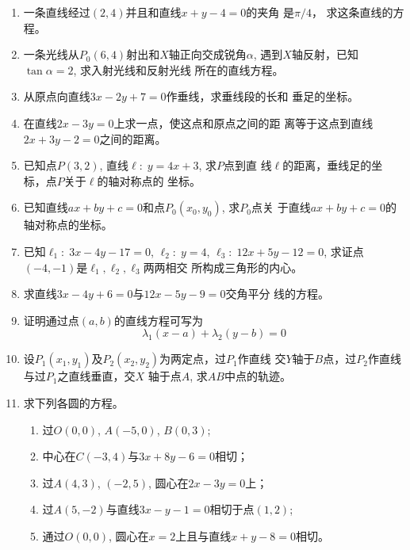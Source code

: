 \begin{enumerate}
\item 一条直线经过$(2,4)$并且和直线$x+y-4=0$的夹角
是$\pi/4$，
求这条直线的方程。
\item 一条光线从$P_0(6,4)$射出和$X$轴正向交成锐角$\alpha$, 
遇到$X$轴反射，已知$\tan\alpha=2$, 求入射光线和反射光线
所在的直线方程。
\item 从原点向直线$3x-2y+7=0$作垂线，求垂线段的长和
垂足的坐标。
\item 在直线$2x-3y=0$上求一点，使这点和原点之间的距
离等于这点到直线$2x+3y-2=0$之间的距离。
\item 已知点$P(3,2)$, 直线$\ell:\; y=4x+3$, 求$P$点到直
线$\ell$的距离，垂线足的坐标，点$P$关于$\ell$的轴对称点的
坐标。
\item 已知直线$ax+by+c=0$和点$P_0(x_0,y_0)$, 求$P_0$点关
于直线$ax+by+c=0$的轴对称点的坐标。
\item 已知$\ell_1:\; 3x-4y-17=0$, $\ell_2:\; y=4$, $\ell_3:\; 12x+5y-12=0$, 求证点$(-4,-1)$是$\ell_1,\ell_2,\ell_3$两两相交
所构成三角形的内心。
\item 求直线$3x-4y+6=0$与$12x-5y-9=0$交角平分
线的方程。
\item 证明通过点$(a,b)$的直线方程可写为
\[\lambda_1(x-a)+\lambda_2(y-b)=0\]
\item 设$P_1(x_1,y_1)$及$P_2(x_2,y_2)$为两定点，过$P_1$作直线
交$Y$轴于$B$点，过$P_2$作直线与过$P_1$之直线垂直，交$X$
轴于点$A$, 求$AB$中点的轨迹。
\item 求下列各圆的方程。
\begin{enumerate}
 \item 过$O(0,0)$, $A(-5,0)$, $B(0,3)$;
\item 中心在$C(-3,4)$与$3x+8y-6=0$相切；
\item 过$A(4,3)$, $(-2,5)$, 圆心在$2x-3y=0$上；
\item 过$A(5,-2)$与直线$3x-y-1=0$相切于点$(1,
2)$;
\item 通过$O(0,0)$, 圆心在$x=2$上且与直线$x+
y-8=0$相切。
\end{enumerate}


\end{enumerate}
